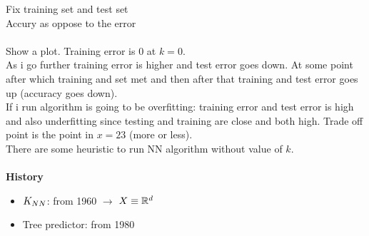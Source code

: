 \documentclass[../main.tex]{subfiles}
\begin{document}
Fix training set and test set\\
Accury as oppose to the error
\\\\
Show a plot. Training error is 0 at $k = 0$.\\
As i go further training error is higher and test error goes down. At some point
after which training and set met and then after that training and test error goes
up (accuracy goes down).\\
If i run algorithm is going to be overfitting: training error and test error is high and also underfitting since testing and training are close and both high.
Trade off point is the point in $x = 23$ (more or less).\\
There are some heuristic to run NN algorithm without value of $k$.
\\\\
\textbf{History}
\begin{itemize}
\item $K_{NN}$: from 1960 $\rightarrow$ $X \equiv \mathbb{R}^d$
\item Tree predictor: from 1980
\\
\end{itemize}
\end{document}
